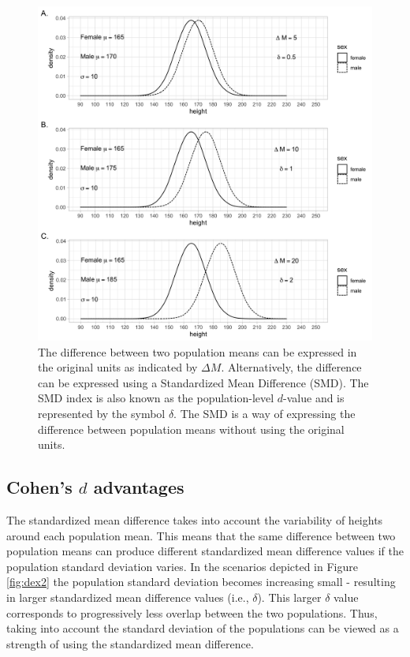 \documentclass[
]{krantz}
\begin{document}
\begin{figure}
\includegraphics[width=1\linewidth]{ch_populations/images/dvalue_ex1} \caption[Illustrating standardized mean difference]{The difference between two population means can be expressed in the original units as indicated by $\Delta M$. Alternatively, the difference can be expressed using a Standardized Mean Difference (SMD). The SMD index is also known as the population-level $d$-value and is represented by the symbol $\delta$. The SMD is a way of expressing the difference between population means without using the original units. }\label{fig:dex1}
\end{figure}

\hypertarget{cohens-d-advantages}{%
\subsection{\texorpdfstring{Cohen's \(d\) advantages}{Cohen's d advantages}}\label{cohens-d-advantages}}

The standardized mean difference takes into account the variability of heights around each population mean. This means that the same difference between two population means can produce different standardized mean difference values if the population standard deviation varies. In the scenarios depicted in Figure \ref{fig:dex2} the population standard deviation becomes increasing small - resulting in larger standardized mean difference values (i.e., \(\delta\)). This larger \(\delta\) value corresponds to progressively less overlap between the two populations. Thus, taking into account the standard deviation of the populations can be viewed as a strength of using the standardized mean difference.
\end{document}
